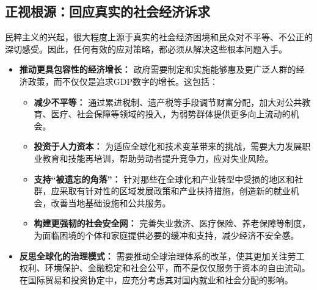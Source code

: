 \documentclass[UTF8, 10pt]{ctexbook}
\begin{document}
\subsection{正视根源：回应真实的社会经济诉求}
民粹主义的兴起，很大程度上源于真实的社会经济困境和民众对不平等、不公正的深切感受。因此，任何有效的应对策略，都必须从解决这些根本问题入手。
\begin{itemize}
    \item \textbf{推动更具包容性的经济增长：} 政府需要制定和实施能够惠及更广泛人群的经济政策，而不仅仅是追求GDP数字的增长。这包括：
    \begin{itemize}
        \item \textbf{减少不平等：} 通过累进税制、遗产税等手段调节财富分配，加大对公共教育、医疗、社会保障等领域的投入，为弱势群体提供更多向上流动的机会。
        \item \textbf{投资于人力资本：} 为适应全球化和技术变革带来的挑战，需要大力发展职业教育和技能再培训，帮助劳动者提升竞争力，应对失业风险。
        \item \textbf{支持“被遗忘的角落”：} 针对那些在全球化和产业转型中受损的地区和社群，应采取有针对性的区域发展政策和产业扶持措施，创造新的就业机会，改善当地基础设施和公共服务。
        \item \textbf{构建更强韧的社会安全网：} 完善失业救济、医疗保险、养老保障等制度，为面临困境的个体和家庭提供必要的缓冲和支持，减少经济不安全感。
    \end{itemize}
    \item \textbf{反思全球化的治理模式：} 需要推动全球治理体系的改革，使其更加关注劳工权利、环境保护、金融稳定和社会公平，而不是仅仅服务于资本的自由流动。在国际贸易和投资协定中，应充分考虑其对国内就业和社会分配的影响。
\end{itemize}
\end{document}
